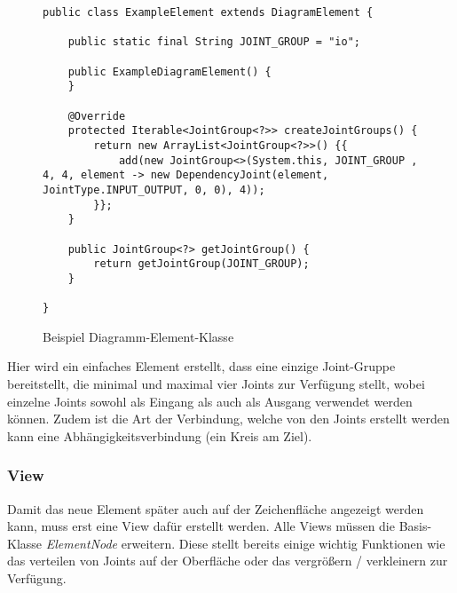 \begin{figure}[H]
	\centering
	\begin{lstlisting}
public class ExampleElement extends DiagramElement {

    public static final String JOINT_GROUP = "io";

    public ExampleDiagramElement() {
    }

    @Override
    protected Iterable<JointGroup<?>> createJointGroups() {
        return new ArrayList<JointGroup<?>>() {{
            add(new JointGroup<>(System.this, JOINT_GROUP , 4, 4, element -> new DependencyJoint(element, JointType.INPUT_OUTPUT, 0, 0), 4));
        }};
    }

    public JointGroup<?> getJointGroup() {
        return getJointGroup(JOINT_GROUP);
    }

}
	\end{lstlisting}
	\caption{Beispiel Diagramm-Element-Klasse}
\end{figure}
Hier wird ein einfaches Element erstellt, dass eine einzige Joint-Gruppe bereitstellt, die minimal und maximal
vier Joints zur Verfügung stellt, wobei einzelne Joints sowohl als Eingang als auch als Ausgang verwendet werden
können. Zudem ist die Art der Verbindung, welche von den Joints erstellt werden kann eine Abhängigkeitsverbindung
(ein Kreis am Ziel).
\subsubsection{View}
Damit das neue Element später auch auf der Zeichenfläche angezeigt werden kann, muss erst eine View dafür erstellt
werden. Alle Views müssen die Basis-Klasse \textit{ElementNode} erweitern. Diese stellt bereits einige wichtig
Funktionen wie das verteilen von Joints auf der Oberfläche oder das vergrößern / verkleinern zur Verfügung.

